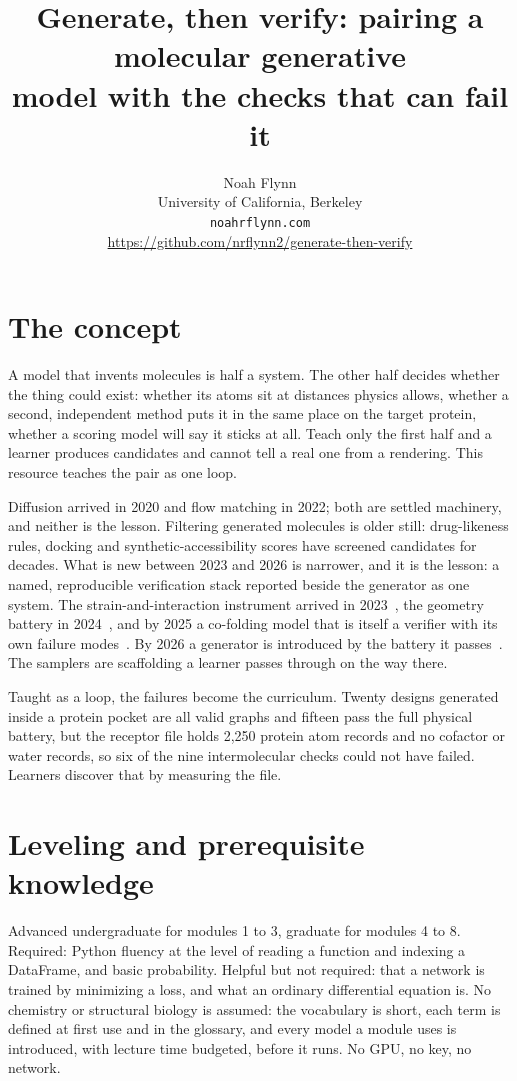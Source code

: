 \documentclass{article}
\title{Generate, then verify: pairing a molecular generative\\model with the checks that can fail it}
\author{%
  Noah Flynn\\
  University of California, Berkeley\\
  \texttt{noahrflynn.com}\\
  \url{https://github.com/nrflynn2/generate-then-verify}
}
\begin{document}
\maketitle

\section{The concept}

A model that invents molecules is half a system. The other half decides whether the thing could
exist: whether its atoms sit at distances physics allows, whether a second, independent method puts
it in the same place on the target protein, whether a scoring model will say it sticks at all. Teach
only the first half and a learner produces candidates and cannot tell a real one from a rendering.
This resource teaches the pair as one loop.

Diffusion arrived in 2020 and flow matching in 2022; both are settled machinery, and neither is the
lesson. Filtering generated molecules is older still: drug-likeness rules, docking and
synthetic-accessibility scores have screened candidates for decades. What is new between 2023 and
2026 is narrower, and it is the lesson: a named, reproducible verification stack reported beside the
generator as one system. The strain-and-interaction instrument arrived in
2023~\citep{harris2023posecheck}, the geometry battery in 2024~\citep{buttenschoen2024posebusters},
and by 2025 a co-folding model that is itself a verifier with its own failure
modes~\citep{passaro2025boltz2}. By 2026 a generator is introduced by the battery it
passes~\citep{vonessen2025tabasco,cremer2026flowr}. The samplers are scaffolding a learner passes
through on the way there.

Taught as a loop, the failures become the curriculum. Twenty designs generated inside a protein
pocket are all valid graphs and fifteen pass the full physical battery, but the receptor file holds
2,250 protein atom records and no cofactor or water records, so six of the nine intermolecular checks
could not have failed. Learners discover that by measuring the file.

\section{Leveling and prerequisite knowledge}

Advanced undergraduate for modules 1 to 3, graduate for modules 4 to 8. Required: Python fluency at
the level of reading a function and indexing a DataFrame, and basic probability. Helpful but not
required: that a network is trained by minimizing a loss, and what an ordinary differential equation
is. No chemistry or structural biology is assumed: the vocabulary is short, each term is defined at
first use and in the glossary, and every model a module uses is introduced, with lecture time
budgeted, before it runs. No GPU, no key, no network.
\end{document}
